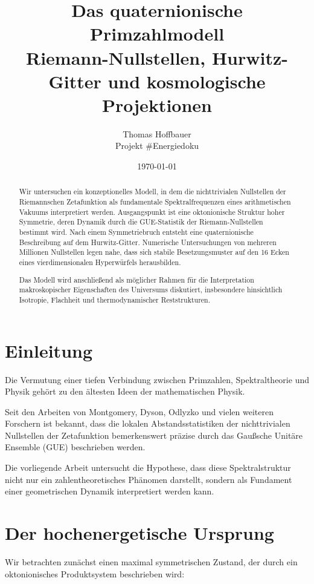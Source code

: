 \documentclass[11pt,a4paper]{article}
\title{
Das quaternionische Primzahlmodell\\
\large Riemann-Nullstellen, Hurwitz-Gitter und kosmologische Projektionen
}
\author{
Thomas Hoffbauer\\
Projekt \#Energiedoku
}
\date{\today}
\begin{document}
\maketitle

\begin{abstract}

Wir untersuchen ein konzeptionelles Modell, in dem die nichttrivialen Nullstellen der Riemannschen Zetafunktion als fundamentale Spektralfrequenzen eines arithmetischen Vakuums interpretiert werden. Ausgangspunkt ist eine oktonionische Struktur hoher Symmetrie, deren Dynamik durch die GUE-Statistik der Riemann-Nullstellen bestimmt wird. Nach einem Symmetriebruch entsteht eine quaternionische Beschreibung auf dem Hurwitz-Gitter. Numerische Untersuchungen von mehreren Millionen Nullstellen legen nahe, dass sich stabile Besetzungsmuster auf den 16 Ecken eines vierdimensionalen Hyperwürfels herausbilden.

Das Modell wird anschließend als möglicher Rahmen für die Interpretation makroskopischer Eigenschaften des Universums diskutiert, insbesondere hinsichtlich Isotropie, Flachheit und thermodynamischer Reststrukturen.

\end{abstract}

\section{Einleitung}

Die Vermutung einer tiefen Verbindung zwischen Primzahlen, Spektraltheorie und Physik gehört zu den ältesten Ideen der mathematischen Physik.

Seit den Arbeiten von Montgomery, Dyson, Odlyzko und vielen weiteren Forschern ist bekannt, dass die lokalen Abstandsstatistiken der nichttrivialen Nullstellen der Zetafunktion bemerkenswert präzise durch das Gaußsche Unitäre Ensemble (GUE) beschrieben werden.

Die vorliegende Arbeit untersucht die Hypothese, dass diese Spektralstruktur nicht nur ein zahlentheoretisches Phänomen darstellt, sondern als Fundament einer geometrischen Dynamik interpretiert werden kann.

\section{Der hochenergetische Ursprung}

Wir betrachten zunächst einen maximal symmetrischen Zustand, der durch ein oktonionisches Produktsystem beschrieben wird:
\end{document}
